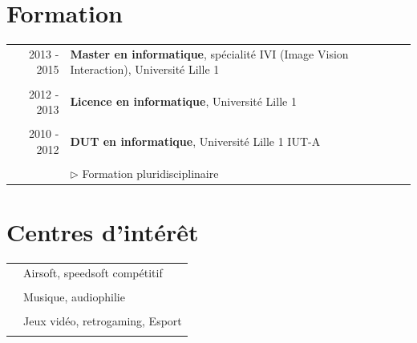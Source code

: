 \documentclass[9pt]{article}
\begin{document}
\section{Formation}
\begin{tabular}{rl}    
	2013 - 2015& \textbf{Master en informatique}, spécialité IVI (Image Vision Interaction), {\small Université Lille 1}\\ & \\	
	2012 - 2013& \textbf{Licence en informatique}, {\small Université Lille 1}\\ & \\	
	2010 - 2012& \textbf{{\small DUT en informatique}}, {\small Université Lille 1 IUT-A}\\           & \\	
		&{$\rhd$ \small Formation pluridisciplinaire}\\
\end{tabular}
%
%
\section{Centres d'intérêt}
\begin{tabular}{rl}    
	& Airsoft, speedsoft compétitif\\ & \\	
	& Musique, audiophilie\\ & \\	
	& Jeux vidéo, retrogaming, Esport\\           & \\	
\end{tabular}
\end{document}
